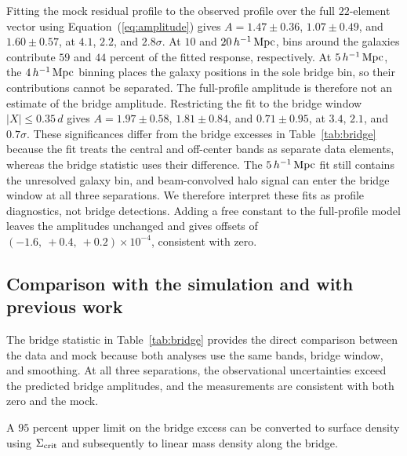 Fitting the mock residual profile to the observed profile over the full
$22$-element vector using Equation~(\ref{eq:amplitude}) gives
$A=1.47\pm0.36$, $1.07\pm0.49$, and $1.60\pm0.57$, at $4.1$, $2.2$, and
$2.8\sigma$.
At $10$ and $20\,h^{-1}\,{\rm Mpc}$, bins around the galaxies contribute $59$ and
$44$ percent of the fitted response, respectively. At $5\,h^{-1}\,{\rm Mpc}$, the
$4\,h^{-1}\,{\rm Mpc}$ binning places the galaxy positions in the sole bridge bin, so
their contributions cannot be separated. The full-profile amplitude is
therefore not an estimate of the bridge amplitude. Restricting the fit to the
bridge window
$|X|\leq0.35\,d$ gives $A=1.97\pm0.58$, $1.81\pm0.84$, and $0.71\pm0.95$, at
$3.4$, $2.1$, and $0.7\sigma$. These significances differ from the bridge
excesses in Table~\ref{tab:bridge} because the fit treats the central and
off-center bands as separate data elements, whereas the bridge statistic
uses their difference. The $5\,h^{-1}\,{\rm Mpc}$ fit still contains the unresolved
galaxy bin, and beam-convolved halo signal can enter the bridge window at all
three separations. We therefore interpret these fits as profile diagnostics,
not bridge detections. Adding a free constant to the full-profile model leaves
the amplitudes unchanged and gives offsets of
$\left(-1.6,\ +0.4,\ +0.2\right)\times10^{-4}$, consistent with zero.

\subsection{Comparison with the simulation and with previous work}
\label{sec:compare}

The bridge statistic in Table~\ref{tab:bridge} provides the direct comparison
between the data and mock because both analyses use the same bands, bridge
window, and smoothing. At all three separations, the observational
uncertainties exceed the predicted bridge amplitudes, and the measurements
are consistent with both zero and the mock.

A $95$ percent upper limit on the bridge excess can be converted to surface
density using $\Sigma_{\rm crit}$ and subsequently to linear mass density
along the bridge.

